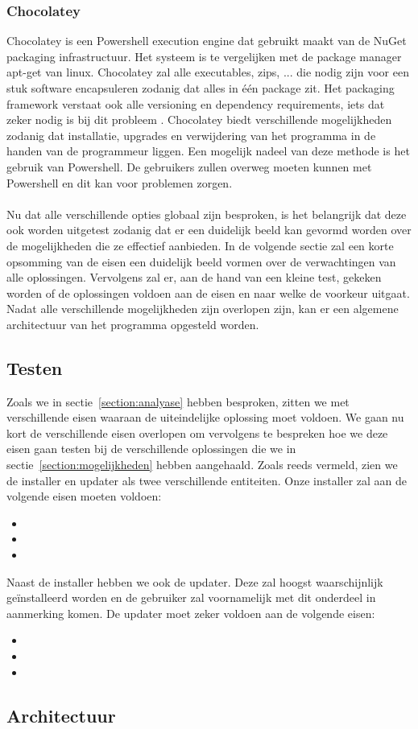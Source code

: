 \documentclass{article}
\begin{document}
\subsubsection{Chocolatey \citep{chocoMain}}
Chocolatey is een Powershell execution engine dat gebruikt maakt van de NuGet packaging infrastructuur.
Het systeem is te vergelijken met de package manager apt-get van linux.
Chocolatey zal alle executables, zips, ... die nodig zijn voor een stuk software encapsuleren zodanig dat alles in \'e\'en package zit.
Het packaging framework verstaat ook alle versioning en dependency requirements, iets dat zeker nodig is bij dit probleem \citep{chocoDoc}.
Chocolatey biedt verschillende mogelijkheden zodanig dat installatie, upgrades en verwijdering van het programma in de handen van de programmeur liggen.
Een mogelijk nadeel van deze methode is het gebruik van Powershell. 
De gebruikers zullen overweg moeten kunnen met Powershell en dit kan voor problemen zorgen. 

\paragraph{}
Nu dat alle verschillende opties globaal zijn besproken, is het belangrijk dat deze ook worden uitgetest zodanig dat er een duidelijk beeld kan gevormd worden over de mogelijkheden die ze effectief aanbieden.
In de volgende sectie zal een korte opsomming van de eisen een duidelijk beeld vormen over de verwachtingen van alle oplossingen.
Vervolgens zal er, aan de hand van een kleine test, gekeken worden of de oplossingen voldoen aan de eisen en naar welke de voorkeur uitgaat.
Nadat alle verschillende mogelijkheden zijn overlopen zijn, kan er een algemene architectuur van het programma opgesteld worden.

\subsection{Testen}
Zoals we in sectie~\vref{section:analyase} hebben besproken, zitten we met verschillende eisen waaraan de uiteindelijke oplossing moet voldoen.
We gaan nu kort de verschillende eisen overlopen om vervolgens te bespreken hoe we deze eisen gaan testen bij de verschillende oplossingen die we in sectie~\vref{section:mogelijkheden} hebben aangehaald.
Zoals reeds vermeld, zien we de installer en updater als twee verschillende entiteiten.
Onze installer zal aan de volgende eisen moeten voldoen:
\begin{itemize}
\item 
\item
\item
\end{itemize}
Naast de installer hebben we ook de updater. Deze zal hoogst waarschijnlijk ge\"installeerd worden en de gebruiker zal voornamelijk met dit onderdeel in aanmerking komen.
De updater moet zeker voldoen aan de volgende eisen:
\begin{itemize}
\item
\item
\item
\end{itemize}

\subsection{Architectuur}


%

\end{document}
